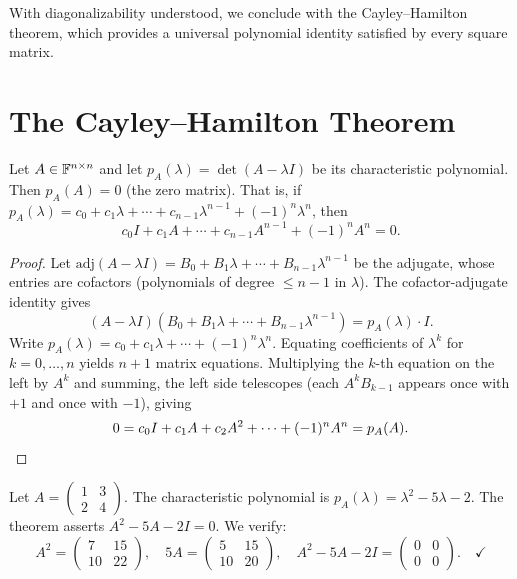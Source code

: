 \documentclass[11pt,a4paper]{article}
\begin{document}
With diagonalizability understood, we conclude with the Cayley--Hamilton
theorem, which provides a universal polynomial identity satisfied by every
square matrix.

\section{The Cayley--Hamilton Theorem}
\label{sec:cayley_hamilton}

\begin{theorem}
\label{thm:cayley_hamilton}
Let $A \in \mathbb{F}^{n \times n}$ and let $p_A(\lambda) = \det(A - \lambda I)$
be its characteristic polynomial.  Then $p_A(A) = 0$ (the zero matrix).
That is, if $p_A(\lambda) = c_0 + c_1 \lambda + \cdots + c_{n-1}\lambda^{n-1}
+ (-1)^n \lambda^n$, then
\[
  c_0 I + c_1 A + \cdots + c_{n-1} A^{n-1} + (-1)^n A^n = 0.
\]
\end{theorem}

\begin{proof}
Let $\mathrm{adj}(A - \lambda I) = B_0 + B_1 \lambda + \cdots + B_{n-1} \lambda^{n-1}$
be the adjugate, whose entries are cofactors (polynomials of degree
$\leq n-1$ in $\lambda$).  The cofactor-adjugate identity gives
\[
  (A - \lambda I)(B_0 + B_1 \lambda + \cdots + B_{n-1}\lambda^{n-1})
  = p_A(\lambda) \cdot I.
\]
Write $p_A(\lambda) = c_0 + c_1\lambda + \cdots + (-1)^n \lambda^n$.
Equating coefficients of $\lambda^k$ for $k = 0, \ldots, n$ yields
$n+1$ matrix equations.  Multiplying the $k$-th equation on the left
by $A^k$ and summing, the left side telescopes (each $A^k B_{k-1}$
appears once with $+1$ and once with $-1$), giving
\[
  0 = c_0 I + c_1 A + c_2 A^2 + \cdots + (-1)^n A^n = p_A(A). \qedhere
\]
\end{proof}

\begin{example}
\label{ex:cayley_hamilton_2x2}
Let $A = \begin{pmatrix} 1 & 3 \\ 2 & 4 \end{pmatrix}$.  The characteristic
polynomial is $p_A(\lambda) = \lambda^2 - 5\lambda - 2$.  The theorem
asserts $A^2 - 5A - 2I = 0$.  We verify:
\[
  A^2 = \begin{pmatrix} 7 & 15 \\ 10 & 22 \end{pmatrix}, \quad
  5A = \begin{pmatrix} 5 & 15 \\ 10 & 20 \end{pmatrix}, \quad
  A^2 - 5A - 2I = \begin{pmatrix} 0 & 0 \\ 0 & 0 \end{pmatrix}. \quad \checkmark
\]
\end{example}
\end{document}
